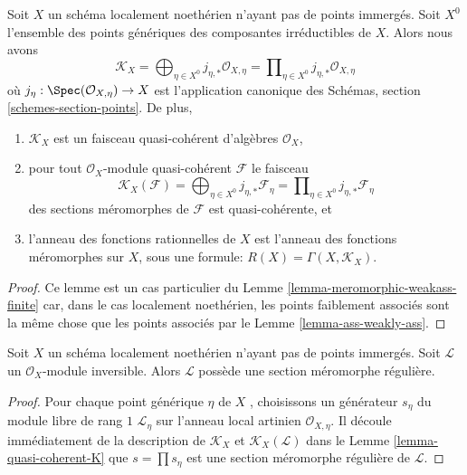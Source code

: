 \begin{lemma}
\label{lemma-quasi-coherent-K}
Soit  $X$  un schéma localement noethérien n'ayant pas de points immergés.
Soit  $X^0$  l'ensemble des points génériques des composantes irréductibles
de  $X$. Alors nous avons
$$
\mathcal{K}_X =
\bigoplus\nolimits_{\eta \in X^0} j_{\eta, *}\mathcal{O}_{X, \eta} =
\prod\nolimits_{\eta \in X^0} j_{\eta, *}\mathcal{O}_{X, \eta}
$$
où  $j_\eta : \Spec(\mathcal{O}_{X, \eta}) \to X$  est l'application canonique des Schémas, section  \ref{schemes-section-points}. De
plus,
\begin{enumerate}
\item $\mathcal{K}_X$  est un faisceau quasi-cohérent d'algèbres  $\mathcal{O}_X$,
\item pour tout  $\mathcal{O}_X$-module quasi-cohérent  $\mathcal{F}$  le faisceau
$$
\mathcal{K}_X(\mathcal{F}) =
\bigoplus\nolimits_{\eta \in X^0} j_{\eta, *}\mathcal{F}_\eta =
\prod\nolimits_{\eta \in X^0} j_{\eta, *}\mathcal{F}_\eta
$$
des sections méromorphes de  $\mathcal{F}$  est quasi-cohérente, et
\item l'anneau des fonctions rationnelles de  $X$  est l'anneau des fonctions
méromorphes sur  $X$, sous une formule:  $R(X) = \Gamma(X, \mathcal{K}_X)$.
\end{enumerate}
\end{lemma}

\begin{proof}
Ce lemme est un cas particulier du Lemme  \ref{lemma-meromorphic-weakass-finite}  car, dans le cas localement
noethérien, les points faiblement associés sont la même chose que les points
associés par le Lemme  \ref{lemma-ass-weakly-ass}.
\end{proof}

\begin{lemma}
\label{lemma-regular-meromorphic-section-exists-noetherian}
Soit  $X$  un schéma localement noethérien n'ayant pas de points immergés.
Soit  $\mathcal{L}$  un  $\mathcal{O}_X$-module inversible. Alors  $\mathcal{L}$  possède
une section méromorphe régulière.
\end{lemma}

\begin{proof}
Pour chaque point générique  $\eta$  de  $X$ , choisissons un générateur
 $s_\eta$  du module libre de rang  $1$   $\mathcal{L}_\eta$  sur l'anneau local
artinien  $\mathcal{O}_{X, \eta}$. Il découle immédiatement de la description de  $\mathcal{K}_X$ 
et  $\mathcal{K}_X(\mathcal{L})$  dans le Lemme  \ref{lemma-quasi-coherent-K}  que  $s = \prod s_\eta$  est une section
méromorphe régulière de  $\mathcal{L}$.
\end{proof}

